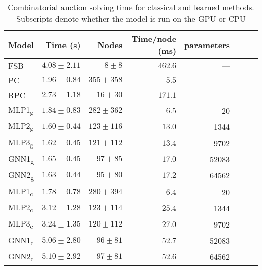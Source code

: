\begin{scriptsize}
\begin{table}[ht]
	\centering
	\begin{tabular}{lrrrrrrr}
	    \toprule
		Model & Time (s) & Nodes  & Time/node (ms) & parameters \\
		\midrule
		FSB & $4.08 \pm 2.11$ & $8 \pm 8$  & $462.6$ & --- \\
		PC  & $1.96 \pm 0.84$ & $355 \pm 358$ & $5.5$ & ---\\
		RPC & $2.73 \pm 1.18$ & $16 \pm 30$ & $ 171.1$ & ---\\
		\addlinespace
		MLP1\textsubscript{g} & $1.84 \pm 0.83$ & $282 \pm 362$ & $6.5$  & 20\\
		MLP2\textsubscript{g} & $\mathbf{1.60 \pm 0.44}$ & $123 \pm 116$ & $13.0$ & 1344\\
		MLP3\textsubscript{g} & $1.62 \pm 0.45$ & $121 \pm 112$ & $13.4$ & 9702\\
		GNN1\textsubscript{g} & $1.65 \pm 0.45$ & $97 \pm 85$   & $17.0$ & 52083\\
		GNN2\textsubscript{g} & $1.63 \pm 0.44$ & $95 \pm 80$   & $17.2$ & 64562\\
		\addlinespace
		MLP1\textsubscript{c} & $1.78 \pm 0.78$ & $280 \pm 394$ & $6.4$  & 20\\
		MLP2\textsubscript{c} & $3.12 \pm 1.28$ & $123 \pm 114$ & $25.4$ & 1344\\
		MLP3\textsubscript{c} & $3.24 \pm 1.35$ & $120 \pm 112$ & $27.0$ & 9702\\
		GNN1\textsubscript{c} & $5.06 \pm 2.80$ & $96 \pm 81$   & $52.7$ & 52083\\
		GNN2\textsubscript{c} & $5.10 \pm 2.92$ & $97 \pm 81$   & $52.6$ & 64562\\
		\bottomrule
	\end{tabular}
	\caption{Combinatorial auction solving time for classical and learned methods. Subscripts denote whether the model is run on the \gls{GPU} or \gls{CPU}}\label{tab:results1_cauction}
\end{table}


\end{scriptsize}
